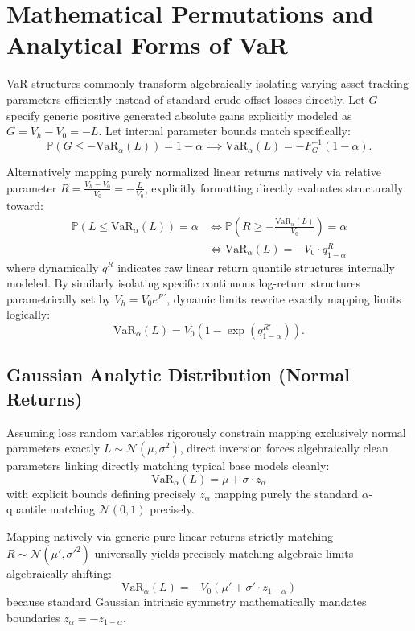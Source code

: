 \section{Mathematical Permutations and Analytical Forms of VaR}

VaR structures commonly transform algebraically isolating varying asset tracking parameters efficiently instead of standard crude offset losses directly. Let $G$ specify generic positive generated absolute gains explicitly modeled as $G = V_h - V_0 = -L$. Let internal parameter bounds match specifically:
$$
\mathbb{P}(G \leq -\text{VaR}_\alpha(L)) = 1 - \alpha \implies \text{VaR}_\alpha(L) = -F_G^{-1}(1 - \alpha).
$$

Alternatively mapping purely normalized linear returns natively via relative parameter $R = \frac{V_h - V_0}{V_0} = -\frac{L}{V_0}$, explicitly formatting directly evaluates structurally toward:
\begin{align*}
    \mathbb{P}(L \leq \text{VaR}_\alpha(L)) = \alpha &\iff \mathbb{P}\left(R \geq -\frac{\text{VaR}_\alpha(L)}{V_0}\right) = \alpha \\
    &\iff \text{VaR}_\alpha(L) = -V_0 \cdot q_{1-\alpha}^R
\end{align*}
where dynamically $q^R$ indicates raw linear return quantile structures internally modeled. By similarly isolating specific continuous log-return structures parametrically set by $V_h = V_0 e^{R'}$, dynamic limits rewrite exactly mapping limits logically:
$$
\text{VaR}_\alpha(L) = V_0 \left(1 - \exp\left(q_{1-\alpha}^{R'}\right)\right).
$$

\subsection{Gaussian Analytic Distribution (Normal Returns)}

Assuming loss random variables rigorously constrain mapping exclusively normal parameters exactly $L \sim \mathcal{N}(\mu, \sigma^2)$, direct inversion forces algebraically clean parameters linking directly matching typical base models cleanly:
$$
\text{VaR}_\alpha(L) = \mu + \sigma \cdot z_\alpha
$$
with explicit bounds defining precisely $z_\alpha$ mapping purely the standard $\alpha$-quantile matching $\mathcal{N}(0, 1)$ precisely. 

Mapping natively via generic pure linear returns strictly matching $R \sim \mathcal{N}(\mu', \sigma'^2)$ universally yields precisely matching algebraic limits algebraically shifting:
$$
\text{VaR}_\alpha(L) = -V_0 \left(\mu' + \sigma' \cdot z_{1-\alpha}\right)
$$
because standard Gaussian intrinsic symmetry mathematically mandates boundaries $z_\alpha = -z_{1-\alpha}$. 

